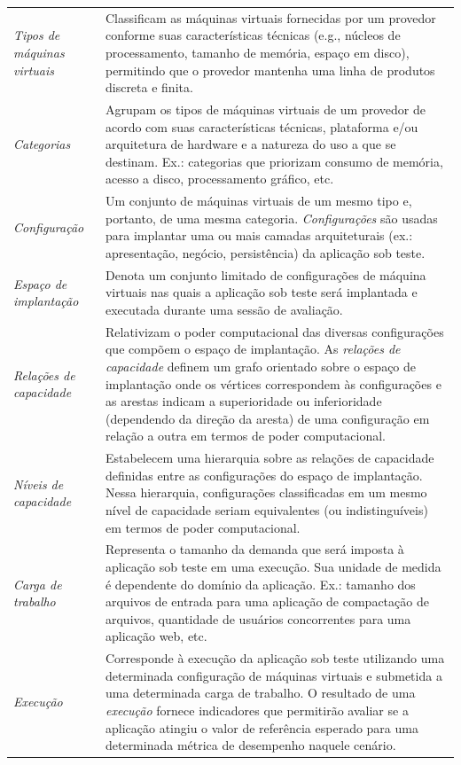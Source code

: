 \documentclass[12pt]{article}
\begin{document}
\begin{table}[t*]
\begin{tabularx}{\linewidth}{lX}
\\[0.03cm]%
\emph{Tipos de máquinas virtuais} &
Classificam as máquinas virtuais fornecidas por um provedor conforme suas características técnicas (e.g., núcleos de processamento, tamanho de memória, espaço em disco), permitindo que o provedor mantenha uma linha de produtos discreta e finita.
\\[0.03cm]%
\emph{Categorias} &
Agrupam os tipos de máquinas virtuais de um provedor de acordo com suas características técnicas, plataforma e/ou arquitetura de hardware e a natureza do uso a que se destinam. Ex.: categorias que priorizam consumo de memória, acesso a disco, processamento gráfico, etc. 
\\[0.03cm]%
\emph{Configuração} &
Um conjunto de máquinas virtuais de um mesmo tipo e, portanto, de uma mesma categoria. {\em Configurações} são usadas para implantar uma ou mais camadas arquiteturais (ex.: apresentação, negócio, persistência) da aplicação sob teste.
\\[0.03cm]%
\emph{Espaço de implantação} &
Denota um conjunto limitado de configurações de máquina virtuais nas quais a aplicação sob teste será implantada e executada durante uma sessão de avaliação. 
\\[0.03cm]%
\emph{Relações de capacidade} &
Relativizam o poder computacional das diversas configurações que compõem o espaço de implantação. As {\em relações de capacidade} definem um grafo orientado sobre o espaço de implantação onde os vértices correspondem às configurações e as arestas indicam a superioridade ou inferioridade (dependendo da direção da aresta) de uma configuração em relação a outra em termos de poder computacional.  
\\[0.03cm]%
\emph{Níveis de capacidade} &
Estabelecem uma hierarquia sobre as relações de capacidade definidas entre as configurações do espaço de implantação. Nessa hierarquia, configurações classificadas em um mesmo nível de capacidade seriam equivalentes (ou indistinguíveis) em termos de poder computacional. 
\\[0.03cm]%
\emph{Carga de trabalho} &
Representa o tamanho da demanda que será imposta à aplicação sob teste em uma execução. Sua unidade de medida é dependente do domínio da aplicação. Ex.: tamanho dos arquivos de entrada para uma aplicação de compactação de arquivos, quantidade de usuários concorrentes para uma aplicação web, etc.
\\[0.03cm]%
\emph{Execução} &
Corresponde à execução da aplicação sob teste utilizando uma determinada configuração de máquinas virtuais e submetida a uma determinada carga de trabalho. O resultado de uma {\em execução} fornece indicadores que permitirão avaliar se a aplicação atingiu o valor de referência esperado para uma determinada métrica de desempenho naquele cenário.
\\%
\bottomrule
\end{tabularx}
\end{table}
\end{document}
